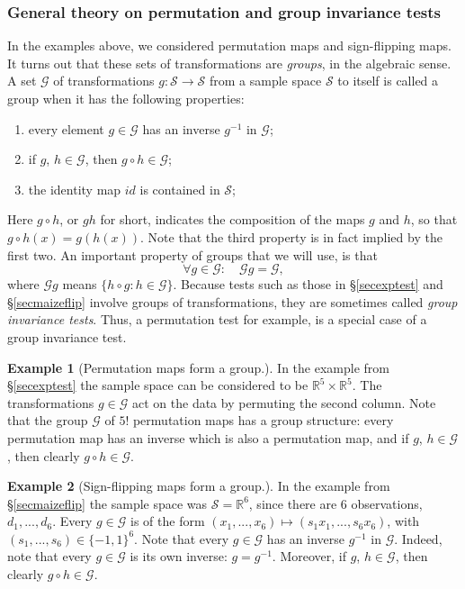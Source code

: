 \documentclass[11pt]{article}
\theoremstyle{plain}
\theoremstyle{definition}
\newtheorem{example}{Example}[section]
\newcommand{\reals}{\mathbb{R}}
\newcommand{\G}{\mathcal{G}}
\newcommand{\X}{\mathcal{X}}
\newcommand{\ssp}{\mathcal{S}}
\begin{document}
\subsubsection{General theory on permutation and group invariance tests} \label{secgroupinv}
In the examples above, we considered permutation maps and sign-flipping maps. It turns out that these sets of transformations are \emph{groups}, in the algebraic sense. A set $\G$ of transformations $g:\ssp\rightarrow\ssp$ from a sample space $\ssp$ to itself is called a group when it has the following properties:
\begin{enumerate}
\item every element $g\in \G$ has an inverse $g^{-1}$ in $\G$;
\item if $g$, $h\in \G$, then $g\circ h\in \G$;
\item the identity map $id$ is contained in $\ssp$;
\end{enumerate}
Here $g\circ h$, or $gh$ for short, indicates the composition of the maps $g$ and $h$, so that $g\circ h(x)=g(h(x))$. Note that the third property is in fact implied by the first two. 
An important property of groups that we will use, is that 
\begin{equation} \label{GgisG}
\forall g\in \G: \quad \G g=\G,
\end{equation}
 where $\G g$ means $\{h\circ g: h\in \G\}$.
Because tests such as those in \S\ref{secexptest} and \S\ref{secmaizeflip} involve groups of transformations, they are sometimes called \emph{group invariance tests}. Thus, a permutation test for example, is a special case of a group invariance test.

\begin{example}[Permutation maps form a group.]
In the example from \S\ref{secexptest} the sample space can be considered to be $ \reals^5\times\reals^5$. The transformations $g\in \G$ act on the data by permuting the second column. Note that the group $\G$ of $5!$ permutation maps has a group structure: every permutation map has an inverse which is also a permutation map, and if $g$, $h\in \G$, then clearly $g\circ h\in \G$.
\end{example}


\begin{example}[Sign-flipping maps form a group.]
In the example from \S\ref{secmaizeflip} the sample space was $\ssp=\reals^6$, since there are 6 observations, $d_1,...,d_6$. %
Every $g\in \G$ is of the form $(x_1,...,x_6)\mapsto (s_1x_1,...,s_6x_6)$, with $(s_1,...,s_6)\in\{-1,1\}^6$.
Note that every $g\in \G$ has an inverse $g^{-1}$ in $\G$. Indeed, note that every $g\in \G$ is its own inverse: $g=g^{-1}$. Moreover, if $g$, $h\in \G$, then clearly $g\circ h\in \G$.
\end{example}
\end{document}
